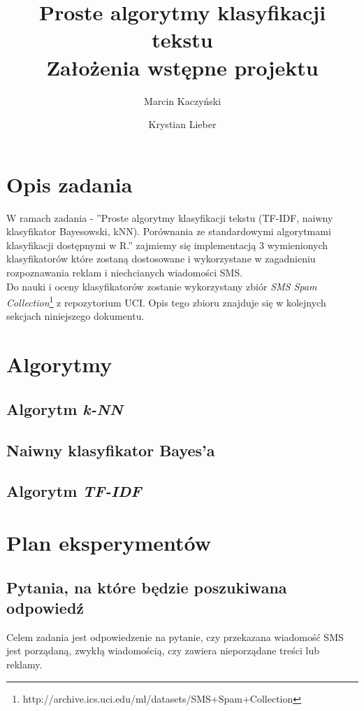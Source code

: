 \documentclass[a4paper,12pt]{article}
\title{Proste algorytmy klasyfikacji tekstu \\ Założenia wstępne projektu}
\author{Marcin Kaczyński \and Krystian Lieber}
\begin{document}
\maketitle

\section{Opis zadania} 

W ramach zadania - ''Proste algorytmy klasyfikacji tekstu (TF-IDF, naiwny klasyfikator Bayesowski, kNN). Porównania ze standardowymi algorytmami klasyfikacji dostępnymi w R.'' zajmiemy się implementacją 3 wymienionych klasyfikatorów które zostaną dostosowane i wykorzystane w zagadnieniu rozpoznawania reklam i niechcianych wiadomości SMS.\\

Do nauki i oceny klasyfikatorów zostanie wykorzystany zbiór \textit{SMS Spam Collection}\footnote{http://archive.ics.uci.edu/ml/datasets/SMS+Spam+Collection} z repozytorium UCI. Opis tego zbioru znajduje się w kolejnych sekcjach niniejszego dokumentu.

\section{Algorytmy}

\subsection{Algorytm \textit{k-NN}}
\subsection{Naiwny klasyfikator Bayes'a}
\subsection{Algorytm \textit{TF-IDF}}

\section{Plan eksperymentów}

\subsection{Pytania, na które będzie poszukiwana odpowiedź}

Celem zadania jest odpowiedzenie na pytanie, czy przekazana wiadomość SMS jest porządaną, zwykłą wiadomością, czy zawiera nieporządane treści lub reklamy.
\end{document}
